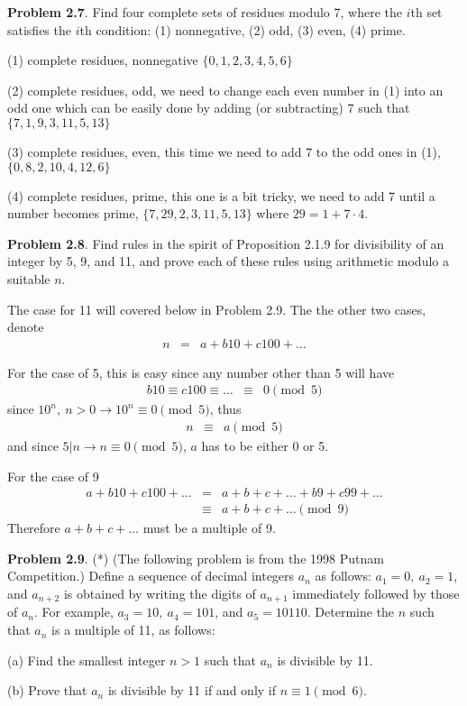 \documentclass[aps,preprint,preprintnumbers,nofootinbib,showpacs,prd]{revtex4-1}
\newcommand{\nbea}{\begin{eqnarray*}}
\newcommand{\neea}{\end{eqnarray*}}
\begin{document}
{\bf Problem 2.7}. Find four complete sets of residues modulo 7, where the $i$th set satisfies the $i$th condition: (1) nonnegative, (2) odd, (3) even, (4) prime.

(1) complete residues, nonnegative $\{0,1,2,3,4,5,6\}$

(2) complete residues, odd, we need to change each even number in (1) into an odd one which can be easily done by adding (or subtracting) 7 such that $\{7,1,9,3,11,5,13\}$

(3) complete residues, even, this time we need to add 7 to the odd ones in (1), $\{0,8,2,10,4,12,6\}$

(4) complete residues, prime, this one is a bit tricky, we need to add 7 until a number becomes prime, $\{7,29,2,3,11,5,13\}$ where $29 = 1 + 7\cdot 4$.

{\bf Problem 2.8}. Find rules in the spirit of Proposition 2.1.9 for divisibility of an integer by 5, 9, and 11, and prove each of these rules using arithmetic modulo a suitable $n$.

The case for 11 will covered below in Problem 2.9. The the other two cases, denote
%
\nbea
n & = & a + b10 + c100 + \dots
\neea
%

For the case of 5, this is easy since any number other than 5 will have 
%
\nbea
b10 \equiv c100 \equiv \dots & \equiv & 0 \pmod{5}
\neea
%
since $10^n,~n > 0 \to 10^n \equiv 0 \pmod{5}$, thus
%
\nbea
n & \equiv & a \pmod{5}
\neea
%
and since $5|n \to n \equiv 0 \pmod{5}$, $a$ has to be either 0 or 5.

For the case of 9
%
\nbea
a + b10 + c100 + \dots & = & a + b + c + \dots + b9 + c99 + \dots \\
& \equiv & a + b + c + \dots \pmod{9}
\neea
%
Therefore $a + b + c + \dots$ must be a multiple of 9.

{\bf Problem 2.9}. (*) (The following problem is from the 1998 Putnam Competition.) Define a sequence of decimal integers $a_n$ as follows: $a_1 = 0,~ a_2 = 1$, and $a_{n+2}$ is obtained by writing the digits of $a_{n+1}$ immediately followed by those of $a_n$. For example, $a_3 = 10,~ a_4 = 101$, and $a_5 = 10110$. Determine the $n$ such that $a_n$ is a multiple of 11, as follows:

(a) Find the smallest integer $n > 1$ such that $a_n$ is divisible by 11.

(b) Prove that $a_n$ is divisible by 11 if and only if $n \equiv 1 \pmod{6}$.
\end{document}
